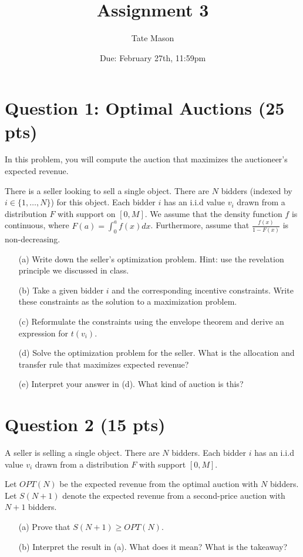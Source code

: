 \documentclass[10pt,a4paper]{article}
\begin{document}
\title{Assignment 3}
\author{Tate Mason}
\date{Due: February 27th, 11:59pm}
\maketitle

\section*{Question 1: Optimal Auctions (25 pts)}
  In this problem, you will compute the auction that maximizes the auctioneer’s expected revenue.

  There is a seller looking to sell a single object. There are $N$ bidders (indexed by $i \in \{1, \dots, N\}$) for this object. Each bidder $i$ has an i.i.d value $v_i$ drawn from a distribution $F$ with support on $[0,M]$. We assume that the density function $f$ is continuous, where $F(a) = \int_{0}^{a} f(x)dx$. Furthermore, assume that $\frac{f(x)}{1-F(x)}$ is non-decreasing.

  \begin{enumerate}
      \item[(a)] Write down the seller’s optimization problem. Hint: use the revelation principle we discussed in class.
      \item[(b)] Take a given bidder $i$ and the corresponding incentive constraints. Write these constraints as the solution to a maximization problem.
      \item[(c)] Reformulate the constraints using the envelope theorem and derive an expression for $t(v_i)$.
      \item[(d)] Solve the optimization problem for the seller. What is the allocation and transfer rule that maximizes expected revenue?
      \item[(e)] Interpret your answer in (d). What kind of auction is this?
  \end{enumerate}

\section*{Question 2 (15 pts)}
  A seller is selling a single object. There are $N$ bidders. Each bidder $i$ has an i.i.d value $v_i$ drawn from a distribution $F$ with support $[0,M]$.

  Let $OPT(N)$ be the expected revenue from the optimal auction with $N$ bidders. Let $S(N+1)$ denote the expected revenue from a second-price auction with $N+1$ bidders.
  \begin{enumerate}
      \item[(a)] Prove that $S(N+1) \geq OPT(N)$.
      \item[(b)] Interpret the result in (a). What does it mean? What is the takeaway?
  \end{enumerate}
\end{document}
